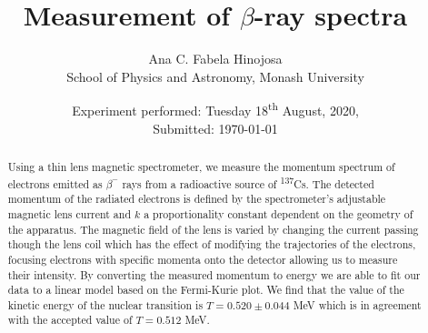 \documentclass[10pt, a4paper]{article}
\title{Measurement of $\beta$-ray spectra}
\author{Ana C. Fabela Hinojosa\\
\small{School of Physics and Astronomy, Monash University}}
\date{Experiment performed: Tuesday 18\textsuperscript{th} August, 2020, \\ Submitted: \today}
\begin{document}
\maketitle
\begin{abstract}
Using a thin lens magnetic spectrometer, we measure the momentum spectrum of electrons emitted as $\beta^{-}$ rays from a radioactive source of \textsuperscript{137}Cs. 
The detected momentum of the radiated electrons is defined by the spectrometer's adjustable magnetic lens current and $k$ a proportionality constant dependent on the geometry of the apparatus. The magnetic field of the lens is varied by changing the current passing though the lens coil which has the effect of modifying the trajectories of the electrons, focusing electrons with specific momenta onto the detector allowing us to measure their intensity. By converting the measured momentum to energy we are able to fit our data to a linear model based on the Fermi-Kurie plot. We find that the value of the kinetic energy of the nuclear transition is $T = 0.520 \pm 0.044$ MeV which is in agreement with the accepted value of $T = 0.512$ MeV\cite{SPA}.
\end{abstract}
\end{document}
